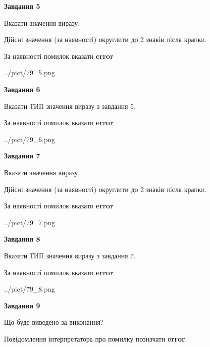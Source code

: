 \documentclass[11pt, ukrainian]{article}
\begin{document}
{\begin {large}
{\begin {center}\textbf{Завдання 5}\end {center}}\par
Вказати значення виразу. \par
Дійсні значення (за наявності) округлити до 2 знаків після крапки. \par
За наявності помилок вказати \textbf{error}

\begin{center}
	{../pict/79_5.png}
\end{center}
\newpage

{\begin {center}\textbf{Завдання 6}\end {center}}\par
Вказати ТИП значення виразу з завдання 5. \par
За наявності помилок вказати \textbf{error}

\begin{center}
	{../pict/79_6.png}
\end{center}
\newpage

{\begin {center}\textbf{Завдання 7}\end {center}}\par
Вказати значення виразу. \par
Дійсні значення (за наявності) округлити до 2 знаків після крапки. \par
За наявності помилок вказати \textbf{error}

\begin{center}
	{../pict/79_7.png}
\end{center}
\newpage

{\begin {center}\textbf{Завдання 8}\end {center}}\par
Вказати ТИП значення виразу з завдання 7. \par
За наявності помилок вказати \textbf{error}

\begin{center}
	{../pict/79_8.png}
\end{center}
\newpage

{\begin {center}\textbf{Завдання 9}\end {center}}\par
Що буде виведено за виконання? \par
Повідомлення інтерпретатора про помилку позначати \textbf{error}


\end{large}}
\end{document}
